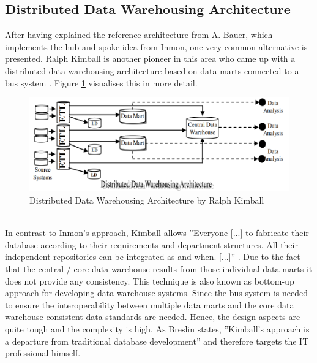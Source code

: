 \subsection{Distributed Data Warehousing Architecture}
After having explained the reference architecture from A. Bauer, which implements the hub and spoke idea from Inmon, one very common alternative is presented. Ralph Kimball is another pioneer in this area who came up with a distributed data warehousing architecture based on data marts connected to a bus system \cite{surveyDWSArchs}. Figure \ref{fig:distributedWarehouseArchitecture} visualises this in more detail.
\begin{figure}[htb]
    \centering
    \includegraphics[scale=0.5]{pictures/DistributedDataWarehouseArchitecture.PNG}
    \caption{Distributed Data Warehousing Architecture by Ralph Kimball \cite{surveyDWSArchs}}
    \label{fig:distributedWarehouseArchitecture}
\end{figure}
\\In contrast to Inmon's approach, Kimball allows ''Everyone [...] to fabricate their database according to their requirements and department structures. All their independent repositories can be integrated as and when. [...]'' \cite{surveyDWSArchs}. Due to the fact that the central / core data warehouse results from those individual data marts it does not provide any consistency. This technique is also known as bottom-up approach for developing data warehouse systems. Since the bus system is needed to ensure the interoperability between multiple data marts and the core data warehouse consistent data standards are needed. Hence, the design aspects are quite tough and the complexity is high. \cite{KimbalVSInmon}\newline
As Breslin states, ''Kimball's approach is a departure from traditional database development'' \cite[p.~19]{KimbalVSInmon} and therefore targets the IT professional himself.\newline


